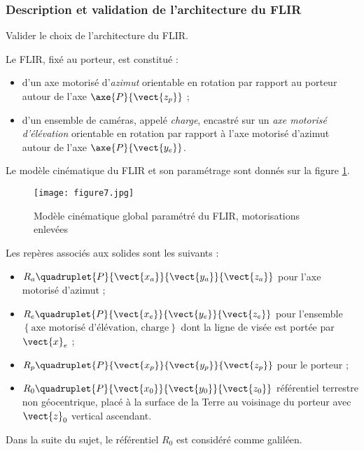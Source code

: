 \subsubsection{Description et validation de l'architecture du FLIR}

\begin{obj}
Valider le choix de l'architecture du FLIR.
\end{obj}

Le FLIR, fixé au porteur, est constitué :
\begin{itemize}
\item d'un axe motorisé d'\textit{azimut} orientable en rotation par rapport au porteur autour de l'axe $\axe{P}{\vect{z_p}}$ ;
\item d'un ensemble de caméras, appelé \textit{charge}, encastré sur un \textit{axe motorisé d'élévation} orientable en rotation
par rapport à l'axe motorisé d'azimut autour de l'axe $\axe{P}{\vect{y_e}}$.
\end{itemize}

Le modèle cinématique du FLIR et son paramétrage sont donnés sur la figure \ref{figure7}.

\begin{figure}[!htb]
\begin{center}
\texttt{[image: figure7.jpg]}
\caption{Modèle cinématique global paramétré du FLIR, motorisations enlevées \label{figure7}}
\end{center}
\end{figure}

Les repères associés aux solides sont les suivants :
\begin{itemize}
\item $R_a\quadruplet{P}{\vect{x_a}}{\vect{y_a}}{\vect{z_a}}$ pour l'axe motorisé d'azimut ;
\item $R_e\quadruplet{P}{\vect{x_e}}{\vect{y_e}}{\vect{z_e}}$ pour l'ensemble $\left\{\text{axe motorisé d'élévation, charge}\right\}$ dont la ligne de visée est portée par $\vect{x}_e$ ;
\item $R_p\quadruplet{P}{\vect{x_p}}{\vect{y_p}}{\vect{z_p}}$ pour le porteur ;
\item $R_0\quadruplet{P}{\vect{x_0}}{\vect{y_0}}{\vect{z_0}}$ référentiel terrestre non géocentrique, placé à la surface de la Terre au voisinage du porteur avec $\vect{z}_0$ vertical ascendant.
\end{itemize}

Dans la suite du sujet, le référentiel \textbf{$R_0$} est considéré comme galiléen.

